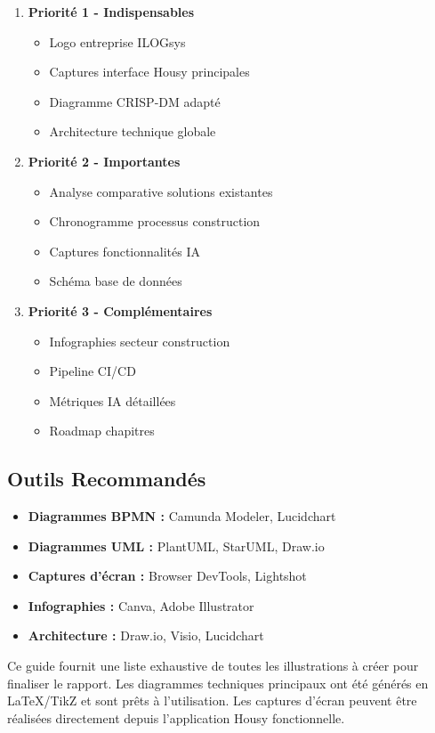 \begin{enumerate}
    \item \textbf{Priorité 1 - Indispensables}
    \begin{itemize}
        \item Logo entreprise ILOGsys
        \item Captures interface Housy principales
        \item Diagramme CRISP-DM adapté
        \item Architecture technique globale
    \end{itemize}
    
    \item \textbf{Priorité 2 - Importantes}
    \begin{itemize}
        \item Analyse comparative solutions existantes
        \item Chronogramme processus construction
        \item Captures fonctionnalités IA
        \item Schéma base de données
    \end{itemize}
    
    \item \textbf{Priorité 3 - Complémentaires}
    \begin{itemize}
        \item Infographies secteur construction
        \item Pipeline CI/CD
        \item Métriques IA détaillées
        \item Roadmap chapitres
    \end{itemize}
\end{enumerate}

\subsection{Outils Recommandés}

\begin{itemize}
    \item \textbf{Diagrammes BPMN :} Camunda Modeler, Lucidchart
    \item \textbf{Diagrammes UML :} PlantUML, StarUML, Draw.io
    \item \textbf{Captures d'écran :} Browser DevTools, Lightshot
    \item \textbf{Infographies :} Canva, Adobe Illustrator
    \item \textbf{Architecture :} Draw.io, Visio, Lucidchart
\end{itemize}

\begin{resultbox}
Ce guide fournit une liste exhaustive de toutes les illustrations à créer pour finaliser le rapport. Les diagrammes techniques principaux ont été générés en LaTeX/TikZ et sont prêts à l'utilisation. Les captures d'écran peuvent être réalisées directement depuis l'application Housy fonctionnelle.
\end{resultbox}
